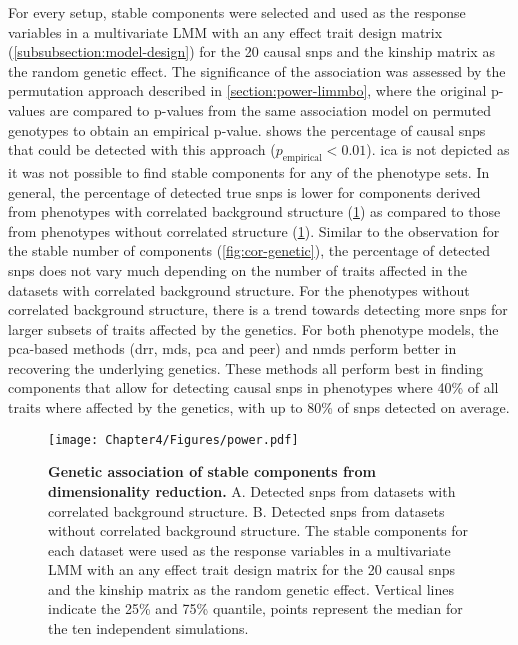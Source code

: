 For every setup, stable components were selected and used as the response variables in a multivariate LMM with an any effect trait design matrix (\cref{subsubsection:model-design}) for the \num{20} causal \glspl{snp} and the kinship matrix as the random genetic effect. The significance of the association was assessed by the permutation approach described in \cref{section:power-limmbo}, where the original p-values are compared to p-values from the same association model on permuted genotypes to obtain an empirical p-value.  shows the percentage of causal \glspl{snp} that could be detected with this approach (\(p_\text{empirical} < 0.01\)). \gls{ica} is not depicted as it was not possible to find stable components for any of the phenotype sets.  In general, the percentage of detected true \glspl{snp} is lower for components derived from phenotypes with correlated background structure (\cref{fig:power-dimRed}) as compared to those from phenotypes without correlated structure (\cref{fig:power-dimRed}). Similar to the observation for the stable number of components (\cref{fig:cor-genetic}), the percentage of detected \glspl{snp} does not vary much depending on the number of traits affected in the datasets with correlated background structure. For the phenotypes without correlated background structure, there is a trend towards detecting more \glspl{snp} for larger subsets of traits affected by the genetics. For both phenotype models, the \gls{pca}-based methods (\gls{drr}, \gls{mds}, \gls{pca} and \gls{peer}) and \gls{nmds} perform better in recovering the underlying genetics. These methods all perform best in finding components that allow for detecting causal \glspl{snp} in phenotypes where \num{40}\% of all traits where affected by the genetics, with up to \num{80}\% of \glspl{snp} detected on average. 
%
\begin{figure}[hbtp]
	\centering
	\texttt{[image: Chapter4/Figures/power.pdf]}
	\caption[\textbf{Genetic association of stable components from dimensionality reduction.}]{\textbf{Genetic association of stable components from dimensionality reduction. } A. Detected \glspl{snp} from datasets with correlated background structure. B.  Detected \glspl{snp} from datasets without correlated background structure. The stable components for each dataset were used as the response variables in a multivariate LMM with an any effect trait design matrix for the \num{20} causal \glspl{snp} and the kinship matrix as the random genetic effect. Vertical lines indicate the \num{25}\% and \num{75}\% quantile, points represent the median for the ten independent simulations. } 
	 	\label{fig:power-dimRed}
\end{figure}
